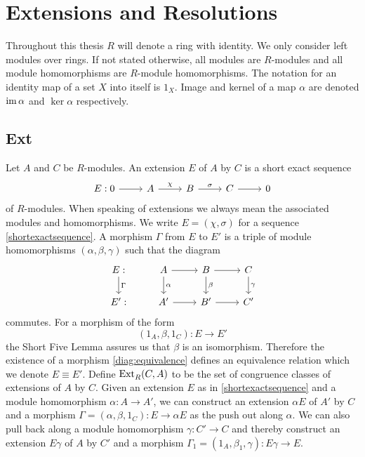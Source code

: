 \section{Extensions and Resolutions}
\label{s:extensionsandresolutions}
Throughout this thesis $R$ will denote a ring with identity.
We only consider left modules over rings.
If not stated otherwise, all modules are $R$-modules and all module homomorphisms are $R$-module homomorphisms.
The notation for an identity map of a set $X$ into itself is $1_X$.
Image and kernel of a map $\alpha$ are denoted $\operatorname{im} \alpha$ and $\ker \alpha$ respectively.
\subsection{Ext}
\label{ss:ext1}
Let $A$ and $C$ be $R$-modules.
An extension $E$ of $A$ by $C$ is a short exact sequence
\begin{equation}
\label{shortexactsequence}
\begin{tikzcd} 
E: 0 \arrow{r} & A \arrow{r}{\chi} & B \arrow{r}{\sigma} & C \arrow{r}& 0
\end{tikzcd}
\end{equation}
of $R$-modules.
When speaking of extensions we always mean the associated modules and homomorphisms.
We write $E=(\chi,\sigma)$ for a sequence \eqref{shortexactsequence}.
A morphism $\Gamma$ from $E$ to $E'$ is a triple of module homomorphisms $(\alpha,\beta,\gamma)$ such that the diagram
\[ 
\begin{tikzcd}
E \arrow{d}{\Gamma}:& A \arrow{r} \arrow{d}{\alpha} & B \arrow{r} \arrow{d}{\beta} & C \arrow{d}{\gamma} \\
E': & A' \arrow{r} & B' \arrow{r} & C'
\end{tikzcd} 
\]
commutes.
For a morphism of the form 
\begin{equation} 
\label{diag:equivalence}
( 1_{A} , \beta , 1_{C} ):E \rightarrow E' 
\end{equation} 
the Short Five Lemma \cite[Lemma I.3.1.]{maclane} assures us that $\beta$ is an isomorphism.
Therefore the existence of a morphism \eqref{diag:equivalence} defines an equivalence relation which we denote $E\equiv E'$.
Define $\operatorname{Ext}^{}_{R}(C,A)$ to be the set of congruence classes of extensions of $A$ by $C$.
Given an extension $E$ as in \eqref{shortexactsequence} and a module homomorphism $\alpha:A\to A'$, we can construct an extension $\alpha E$ of $A'$ by $C$ and a morphism $\Gamma=(\alpha, \beta, 1_C): E \to \alpha E$ as the push out along $\alpha$.
We can also pull back along a module homomorphism $\gamma: C' \to C$ and thereby construct an extension $E \gamma$ of $A$ by $C'$ and a morphism $\Gamma_1=(1_A,\beta_1, \gamma): E\gamma \to E$.
